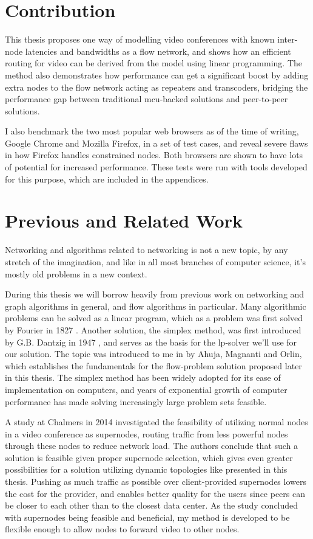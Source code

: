 \section{Contribution}

This thesis proposes one way of modelling video conferences with known inter-node latencies and bandwidths as a flow network, and shows how an efficient routing for video can be derived from the model using linear programming. The method also demonstrates how performance can get a significant boost by adding extra nodes to the flow network acting as repeaters and transcoders, bridging the performance gap between traditional \gls{mcu}-backed solutions and peer-to-peer solutions.

I also benchmark the two most popular web browsers as of the time of writing, Google Chrome and Mozilla Firefox, in a set of test cases, and reveal severe flaws in how Firefox handles constrained nodes. Both browsers are shown to have lots of potential for increased performance. These tests were run with tools developed for this purpose, which are included in the appendices.


\section{Previous and Related Work}

Networking and algorithms related to networking is not a new topic, by any stretch of the imagination, and like in all most branches of computer science, it's mostly old problems in a new context.

During this thesis we will borrow heavily from previous work on networking and graph algorithms in general, and flow algorithms in particular. Many algorithmic problems can be solved as a linear program, which as a problem was first solved by Fourier in 1827 \cite{sierksma2001linear}. Another solution, the simplex method, was first introduced by G.B. Dantzig in 1947 \cite{sierksma2001linear}, and serves as the basis for the \gls{lp}-solver we'll use for our solution. The topic was introduced to me in \cite{ahuja1988network} by Ahuja, Magnanti and Orlin, which establishes the fundamentals for the flow-problem solution proposed later in this thesis. The simplex method has been widely adopted for its ease of implementation on computers, and years of exponential growth of computer performance has made solving increasingly large problem sets feasible.

A study at Chalmers in 2014 \cite{tree-topology-webrtc} investigated the feasibility of utilizing normal nodes in a video conference as supernodes, routing traffic from less powerful nodes through these nodes to reduce network load. The authors conclude that such a solution is feasible given proper supernode selection, which gives even greater possibilities for a solution utilizing dynamic topologies like presented in this thesis. Pushing as much traffic as possible over client-provided supernodes lowers the cost for the provider, and enables better quality for the users since peers can be closer to each other than to the closest data center. As the study concluded with supernodes being feasible and beneficial, my method is developed to be flexible enough to allow nodes to forward video to other nodes.

